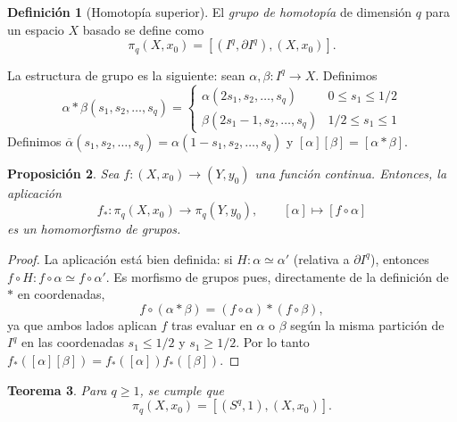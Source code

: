 \documentclass[11pt,a4paper]{article}
\theoremstyle{plain}
\newtheorem{theorem}{Teorema}[section]
\newtheorem{proposition}[theorem]{Proposición}
\theoremstyle{definition}
\newtheorem{definition}[theorem]{Definición}
\theoremstyle{remark}
\begin{document}
\begin{definition}[Homotopía superior]
\label{def:homotopia-superior}
El \emph{grupo de homotopía} de dimensión $q$ para un espacio $X$ basado se
define como
\[
\pi_q(X,x_0)=[(I^q,\partial I^q),(X,x_0)].
\]

La estructura de grupo es la siguiente: sean $\alpha,\beta:I^q\to X$.
Definimos
\[
\alpha*\beta(s_1,s_2,\dots,s_q)=\begin{cases}
\alpha(2s_1,s_2,\dots,s_q) & 0\le s_1\le 1/2\\
\beta(2s_1-1,s_2,\dots,s_q) & 1/2\le s_1\le 1
\end{cases}
\]
Definimos $\overline\alpha(s_1,s_2,\dots,s_q)=\alpha(1-s_1,s_2,\dots,s_q)$ y
$[\alpha][\beta]=[\alpha*\beta]$.
\end{definition}

\begin{proposition}
\label{prop:fpushforward-hom}
Sea $f:(X,x_0)\to(Y,y_0)$ una función continua. Entonces, la aplicación
\[
f_*:\pi_q(X,x_0)\to\pi_q(Y,y_0), \qquad [\alpha]\mapsto[f\circ\alpha]
\]
es un homomorfismo de grupos.
\end{proposition}

\begin{proof}
La aplicación está bien definida: si $H:\alpha\simeq\alpha'$ (relativa a
$\partial I^q$), entonces $f\circ H:f\circ\alpha\simeq f\circ\alpha'$. Es
morfismo de grupos pues, directamente de la definición de $*$ en
coordenadas,
\[
f\circ(\alpha*\beta)=(f\circ\alpha)*(f\circ\beta),
\]
ya que ambos lados aplican $f$ tras evaluar en $\alpha$ o $\beta$ según la
misma partición de $I^q$ en las coordenadas $s_1\le1/2$ y $s_1\ge1/2$. Por
lo tanto $f_*([\alpha][\beta])=f_*([\alpha])f_*([\beta])$.
\end{proof}

\begin{theorem}
\label{thm:pi_q-sphere}
Para $q\ge1$, se cumple que
\[
\pi_q(X,x_0)=[(S^q,1),(X,x_0)].
\]
\end{theorem}
\end{document}
